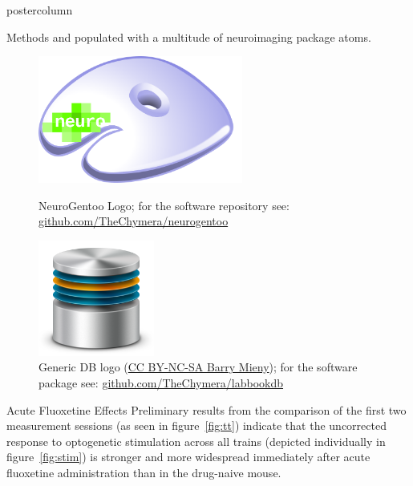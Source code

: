 \documentclass{beamer}
\begin{document}
\begin{frame}
\begin{columns}
\begin{column}{.57\textwidth}
\begin{beamercolorbox}[center]{postercolumn}
\begin{minipage}{.98\textwidth}
{\begin{myblock}{Methods}
						and populated with a multitude of neuroimaging package atoms.
						\vspace{0.5em}
						\begin{figure}
							\begin{minipage}{0.43\textwidth}
								\centering\includegraphics[width=0.6\textwidth]{img/ng_large.png}
								\caption{NeuroGentoo Logo; for the software repository see: \href{https://github.com/TheChymera/neurogentoo}{github.com/TheChymera/neurogentoo}}
							\end{minipage}
							\hspace{1em}
							\begin{minipage}{0.45\textwidth}
								\centering\includegraphics[width=0.34\textwidth]{img/db.png}
								\caption{Generic DB logo (\href{https://creativecommons.org/licenses/by-nc-sa/3.0/}{CC BY-NC-SA Barry Mieny}); for the software package see: \href{https://github.com/TheChymera/labbookdb}{github.com/TheChymera/labbookdb}}
							\end{minipage}
						\end{figure}
					\end{myblock}\vfill
					\begin{myblock}{Acute Fluoxetine Effects}
						Preliminary results from the comparison of the first two measurement sessions (as seen in figure~\ref{fig:tt}) indicate that the uncorrected response to optogenetic stimulation across all trains (depicted individually in figure~\ref{fig:stim}) is stronger and more widespread immediately after acute fluoxetine administration than in the drug-naive mouse.

\end{myblock}}
\end{minipage}
\end{beamercolorbox}
\end{column}
\end{columns}
\end{frame}
\end{document}

